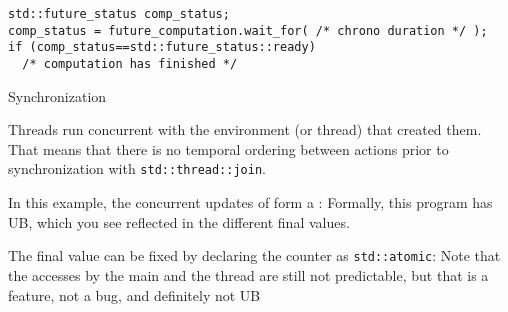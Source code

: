 \begin{lstlisting}
std::future_status comp_status;
comp_status = future_computation.wait_for( /* chrono duration */ );
if (comp_status==std::future_status::ready)
  /* computation has finished */
\end{lstlisting}

 {Synchronization}

Threads run concurrent with the environment (or thread)
that created them.
That means that there is no temporal ordering between actions
prior to synchronization with \lstinline+std::thread::join+.

In this example, the concurrent updates of 
form a :
%
%
Formally, this program has \acf{UB},
which you see reflected in the different final values.

The final value can be fixed by declaring the counter
as \lstinline+std::atomic+:
%
%
Note that the accesses by the main and the thread
are still not predictable, but that is a feature,
not a bug, and definitely not \ac{UB}
